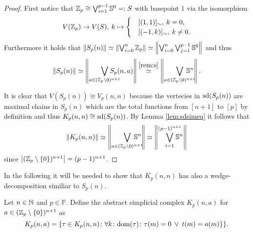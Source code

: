 \begin{proof}
  First notice that $\mathbb{Z}_p \cong \bigvee_{i=1}^{p-1}\mathbb{S}^0 =: S$ with basepoint $1$ via the isomorphism
  \begin{equation*}
    V(\mathbb{Z}_p) \to V(S), \: k \mapsto \begin{cases}
      &[(1, 1)]_\sim, \: k = 0, \\
      &[(-1,k)]_\sim, \: k \neq 0.
    \end{cases}
  \end{equation*}
  Furthermore it holds that $\lVert S_p(n) \rVert \simeq \left\lVert \bigvee_{i=0}^n\mathbb{Z}_p \right\rVert \simeq \left\lVert \bigvee_{i=0}^n\bigvee_{j=1}^{p-1}\mathbb{S}^0 \right\rVert$ and thus
  \begin{equation*}
    \lVert S_p(n) \rVert \simeq \left\lVert \bigvee_{a\in(\Z_p \setminus {0})^{n+1}} \hspace*{-17px}S_p(n,a) \right\rVert \overset{\ref{rem:s}}{\simeq} \left\lVert \bigvee_{a\in(\Z_p \setminus {0})^{n+1}}\hspace*{-15px}\mathbb{S}^n \right\rVert.
  \end{equation*}

  It is clear that $V(S_p(n)) \cong V_p(n,n)$ because the vertecies in ${\rm sd}(S_p(n))$ are maximal chains in $S_p(n)$ which are the total functions from $[n+1]$ to $[p]$ by definition and thus $K_p(n,n) \cong {\rm sd}(S_p(n))$. By Lemma \ref{lem:sdsimeq} it follows that
  \begin{equation*}
    \lVert K_p(n, n) \rVert \simeq \left\lVert \bigvee_{a\in(\Z_p \setminus {0})^{n+1}}\hspace*{-15px}\mathbb{S}^n \right\rVert \simeq \left\lVert \bigvee_{i=1}^{(p-1)^{n+1}}\hspace*{-10px}\mathbb{S}^n \right\rVert
  \end{equation*}
  since $\left|(\mathbb{Z}_p\setminus\{0\})^{n+1}\right| = (p-1)^{n+1}$.
\end{proof}

In the following it will be needed to show that $K_p(n,n)$ has also a wedge-decomposition similiar to $S_p(n)$.
\begin{defin}
  Let $n\in\mathbb{N}$ and $p\in \mathbb{P}$. Define the abstract simplicial complex $K_p(n,a)$ for $a \in (\mathbb{Z}_p\setminus\{0\})^{n+1}$ as
  \begin{equation*}
    K_p(n,a) = \{\tau \in K_p(n,n)\colon \forall k\colon{\rm dom}(\tau)\colon \tau(m) = 0 \: \lor \: t(m) = a(m)\}\}.
  \end{equation*}
\end{defin}

